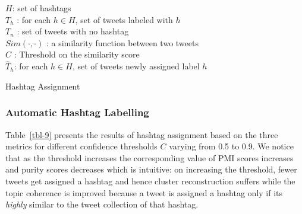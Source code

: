 \documentclass{sig-alternate}
\begin{document}
\vspace{-4mm}
\incmargin{1.5em}
\linesnumbered
\begin{algorithm}[hb!]
\dontprintsemicolon

\Input
{
$H$: set of hashtags \\
$T_h$ : for each $h \in H$, set of tweets labeled with $h$ \\
$T_n$ : set of tweets with no hashtag \\
$\mathit{Sim}(\cdot,\cdot)$ : a similarity function between two tweets\\
$C$ : Threshold on the similarity score\\
}
\Output
{
$\hat{T}_h$: for each $h \in H$, set of tweets newly assigned label $h$\\
}
\vspace{-1mm}
\caption{{\sc Hashtag Assignment} \label{alg-1}}
\end{algorithm}
\decmargin{1.5em}


\subsubsection*{Automatic Hashtag Labelling}

Table~\ref{tbl-9} presents the results of hashtag assignment based on
the three metrics for different confidence thresholds $C$ varying from
0.5 to 0.9. We notice that as the threshold increases the
corresponding value of PMI scores increases and purity scores
decreases which is intuitive: on increasing the threshold, fewer 
tweets get assigned a hashtag and hence cluster
reconstruction suffers while the topic coherence is improved because a
tweet is assigned a hashtag only if its \emph{highly} similar to the tweet
collection of that hashtag.
\end{document}
